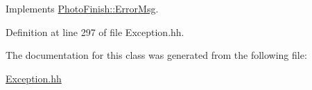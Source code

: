 Implements \hyperlink{class_photo_finish_1_1_error_msg_ae84614a0c68520a7ad11e699c1504e82}{Photo\+Finish\+::\+Error\+Msg}.



Definition at line 297 of file Exception.\+hh.



The documentation for this class was generated from the following file\+:\begin{DoxyCompactItemize}
\item 
\hyperlink{_exception_8hh}{Exception.\+hh}\end{DoxyCompactItemize}
